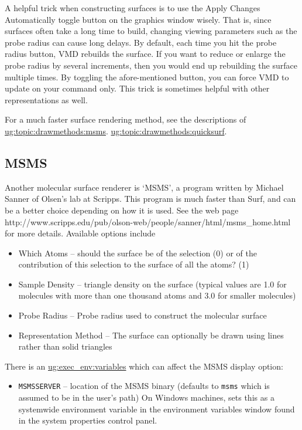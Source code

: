 A helpful trick when constructing surfaces is to use the {\sf Apply
Changes Automatically} toggle button on the graphics window wisely.
That is, since surfaces often take a long time to build, changing
viewing parameters such as the probe radius can cause long delays.  By
default, each time you hit the probe radius button, VMD rebuilds the
surface.  If you want to reduce or enlarge the probe radius by several
increments, then you would end up rebuilding the surface multiple
times.  By toggling the afore-mentioned button, you can force VMD to
update on your command only.  This trick is sometimes helpful with
other representations as well.

For a much faster surface rendering method, see the descriptions of
\hyperref{`MSMS'}{`MSMS' [\S~}{]}{ug:topic:drawmethods:msms}.
\hyperref{`QuickSurf'}{`QuickSurf' [\S~}{]}{ug:topic:drawmethods:quicksurf}.


\subsection{MSMS}
\label{ug:topic:drawmethods:msms}
Another molecular surface renderer is `MSMS', a program written by
Michael Sanner of Olsen's lab at Scripps.  This program is much faster
than Surf, and can be a better choice depending on how it is used.
See the web page 
{http://www.scripps.edu/pub/olson-web/people/sanner/html/msms\_home.html}
for more details.  Available options include
\begin{itemize}
\item Which Atoms -- should the surface be of the selection (0) or of the 
contribution of this selection to the surface of all the atoms? (1)
\item Sample Density -- triangle density on the surface (typical values are 1.0
for molecules with more than one thousand atoms and 3.0 for smaller molecules)
\item Probe Radius -- Probe radius used to construct the molecular surface
\item Representation Method -- The surface can optionally be drawn using
lines rather than solid triangles
\end{itemize}

There is an \hyperref{environment variable}{environment variable
[\S~}{]}{ug:exec_env:variables} which can affect the MSMS display option:
\begin{itemize}
  \item{\tt MSMSSERVER} -- location of the MSMS binary (defaults to
                        {\tt msms} which is assumed to be in the user's path)
                        On Windows machines, sets this as a systemwide 
                        environment variable in the environment variables
                        window found in the system properties control panel.
\end{itemize}



